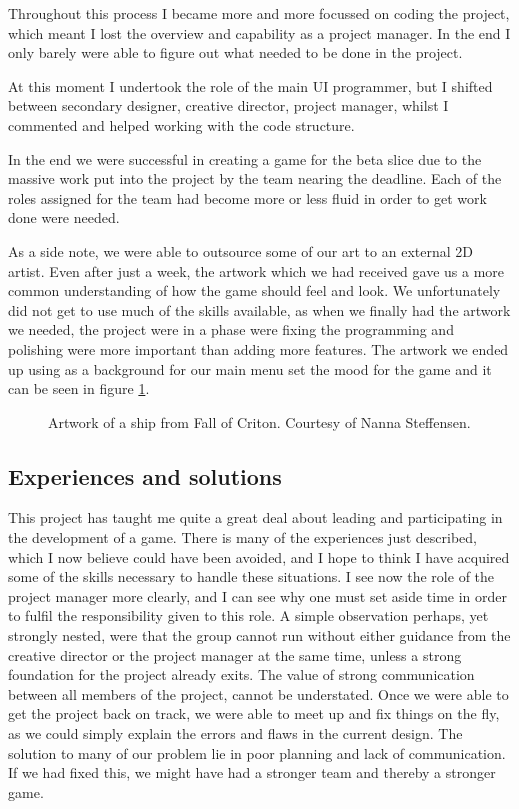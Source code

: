 \documentclass[a4paper,11pt]{article}
\begin{document}
Throughout this process I became more and more focussed on coding the project, which meant I lost the overview and capability as a project manager. In the end I only barely were able to figure out what needed to be done in the project.

At this moment I undertook the role of the main UI programmer, but I shifted between secondary designer, creative director, project manager, whilst I commented and helped working with the code structure.

In the end we were successful in creating a game for the beta slice due to the massive work put into the project by the team nearing the deadline. Each of the roles assigned for the team had become more or less fluid in order to get work done were needed.

As a side note, we were able to outsource some of our art to an external 2D artist. Even after just a week, the artwork which we had received gave us a more common understanding of how the game should feel and look. We unfortunately did not get to use much of the skills available, as when we finally had the artwork we needed, the project were in a phase were fixing the programming and polishing were more important than adding more features. The artwork we ended up using as a background for our main menu set the mood for the game and it can be seen in figure \ref{ArtShip}.

\begin{figure}[h]
	\centering
	\caption{Artwork of a ship from Fall of Criton. Courtesy of Nanna Steffensen.}
	\label{ArtShip}
\end{figure}
\subsection{Experiences and solutions}
This project has taught me quite a great deal about leading and participating in the development of a game. There is many of the experiences just described, which I now believe could have been avoided, and I hope to think I have acquired some of the skills necessary to handle these situations.
I see now the role of the project manager more clearly, and I can see why one must set aside time in order to fulfil the responsibility given to this role. 
A simple observation perhaps, yet strongly nested, were that the group cannot run without either guidance from the creative director or the project manager at the same time, unless a strong foundation for the project already exits.  
The value of strong communication between all members of the project, cannot be understated. Once we were able to get the project back on track, we were able to meet up and fix things on the fly, as we could simply explain the errors and flaws in the current design. 
The solution to many of our problem lie in poor planning and lack of communication. If we had fixed this, we might have had a stronger team and thereby a stronger game. 
\end{document}
